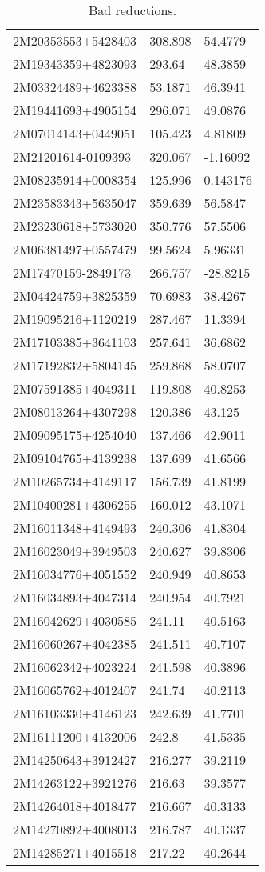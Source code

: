 \documentclass[fleqn,usenatbib]{mnras}
\begin{document}
\begin{table}
\begin{tabular}{lll}
2M20353553+5428403 &  308.898 &   54.4779 \\
2M19343359+4823093 &   293.64 &   48.3859 \\
2M03324489+4623388 &  53.1871 &   46.3941 \\
2M19441693+4905154 &  296.071 &   49.0876 \\
2M07014143+0449051 &  105.423 &   4.81809 \\
2M21201614-0109393 &  320.067 &  -1.16092 \\
2M08235914+0008354 &  125.996 &  0.143176 \\
2M23583343+5635047 &  359.639 &   56.5847 \\
2M23230618+5733020 &  350.776 &   57.5506 \\
2M06381497+0557479 &  99.5624 &   5.96331 \\
2M17470159-2849173 &  266.757 &  -28.8215 \\
2M04424759+3825359 &  70.6983 &   38.4267 \\
2M19095216+1120219 &  287.467 &   11.3394 \\
2M17103385+3641103 &  257.641 &   36.6862 \\
2M17192832+5804145 &  259.868 &   58.0707 \\
2M07591385+4049311 &  119.808 &   40.8253 \\
2M08013264+4307298 &  120.386 &    43.125 \\
2M09095175+4254040 &  137.466 &   42.9011 \\
2M09104765+4139238 &  137.699 &   41.6566 \\
2M10265734+4149117 &  156.739 &   41.8199 \\
2M10400281+4306255 &  160.012 &   43.1071 \\
2M16011348+4149493 &  240.306 &   41.8304 \\
2M16023049+3949503 &  240.627 &   39.8306 \\
2M16034776+4051552 &  240.949 &   40.8653 \\
2M16034893+4047314 &  240.954 &   40.7921 \\
2M16042629+4030585 &   241.11 &   40.5163 \\
2M16060267+4042385 &  241.511 &   40.7107 \\
2M16062342+4023224 &  241.598 &   40.3896 \\
2M16065762+4012407 &   241.74 &   40.2113 \\
2M16103330+4146123 &  242.639 &   41.7701 \\
2M16111200+4132006 &    242.8 &   41.5335 \\
2M14250643+3912427 &  216.277 &   39.2119 \\
2M14263122+3921276 &   216.63 &   39.3577 \\
2M14264018+4018477 &  216.667 &   40.3133 \\
2M14270892+4008013 &  216.787 &   40.1337 \\
2M14285271+4015518 &   217.22 &   40.2644 \\
  \bottomrule
  \end{tabular}
  \caption{Bad reductions.}
  \label{tab:bad_reduct}
\end{table}
\end{document}
